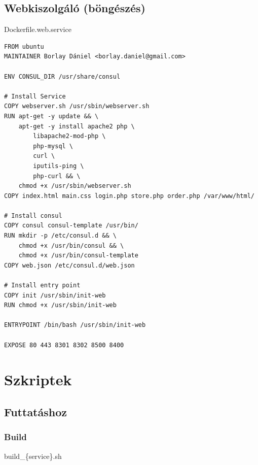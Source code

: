 \documentclass[11pt,magyar,a4paper,twoside,]{report}
\begin{document}
\subsection{Webkiszolgáló
(böngészés)}\label{webkiszolguxe1luxf3-buxf6nguxe9szuxe9s}

Dockerfile.web.service

\begin{verbatim}
FROM ubuntu
MAINTAINER Borlay Dániel <borlay.daniel@gmail.com>

ENV CONSUL_DIR /usr/share/consul

# Install Service
COPY webserver.sh /usr/sbin/webserver.sh
RUN apt-get -y update && \
    apt-get -y install apache2 php \
        libapache2-mod-php \
        php-mysql \
        curl \
        iputils-ping \
        php-curl && \
    chmod +x /usr/sbin/webserver.sh
COPY index.html main.css login.php store.php order.php /var/www/html/

# Install consul
COPY consul consul-template /usr/bin/
RUN mkdir -p /etc/consul.d && \
    chmod +x /usr/bin/consul && \
    chmod +x /usr/bin/consul-template
COPY web.json /etc/consul.d/web.json

# Install entry point
COPY init /usr/sbin/init-web
RUN chmod +x /usr/sbin/init-web

ENTRYPOINT /bin/bash /usr/sbin/init-web

EXPOSE 80 443 8301 8302 8500 8400
\end{verbatim}

\section{Szkriptek}\label{szkriptek}

\subsection{Futtatáshoz}\label{futtatuxe1shoz}

\subsubsection{\texorpdfstring{Build\label{appendix-build}}{Build}}\label{build}

build\_\{service\}.sh
\end{document}
